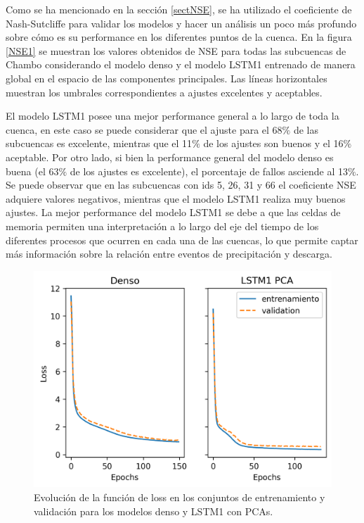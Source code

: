 Como se ha mencionado en la sección \ref{sectNSE}, se ha utilizado el coeficiente de Nash-Sutcliffe para
validar los modelos y hacer un análisis un poco más profundo sobre cómo es su performance en los diferentes puntos
de la cuenca. En la figura \ref{NSE1} se muestran los valores obtenidos 
de NSE para todas las subcuencas de Chambo considerando el modelo denso y el modelo LSTM1 entrenado de manera global 
en el espacio de las componentes principales. Las líneas horizontales muestran los umbrales correspondientes a 
ajustes excelentes y aceptables. 

El modelo LSTM1 posee una mejor performance general a lo largo de toda la cuenca, 
en este caso se  puede considerar que el ajuste para el 68$\%$ de las subcuencas es excelente, 
mientras que el 11$\%$ de los ajustes son buenos y el 16$\%$  aceptable. 
Por otro lado, si bien la performance general del modelo denso es buena (el 63$\%$ de los ajustes es excelente), 
el porcentaje de fallos asciende al 13$\%$. Se puede observar que en las subcuencas con ids 5, 26, 31 y 66 el coeficiente NSE adquiere 
valores negativos, mientras que el modelo LSTM1 realiza muy buenos ajustes.
La mejor performance del modelo LSTM1 se debe a que las celdas de memoria permiten una interpretación a lo largo del eje del tiempo de 
los diferentes procesos que ocurren en cada una de las cuencas, lo que permite captar más información sobre la relación entre
eventos de precipitación y descarga. 


\begin{figure}[h!]
  \begin{center}
    \includegraphics[height=3.in]{Figures/loss/comp_loss.png}
    \caption{ Evolución de la función de loss en los conjuntos de entrenamiento y validación para los modelos denso y
    LSTM1 con PCAs.}
    \label{losscomp}
  \end{center}
\end{figure}

